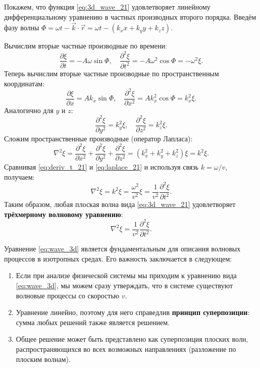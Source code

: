 \begin{theorem}
Покажем, что функция \eqref{eq:3d_wave_21} удовлетворяет линейному дифференциальному уравнению в частных производных второго порядка. Введём фазу волны $\Phi = \omega t - \vec{k} \cdot \vec{r} = \omega t - (k_x x + k_y y + k_z z)$.

Вычислим вторые частные производные по времени:
\begin{equation}
    \frac{\partial \xi}{\partial t} = -A\omega \sin\Phi, \quad
    \frac{\partial^2 \xi}{\partial t^2} = -A\omega^2 \cos\Phi = -\omega^2 \xi. \label{eq:deriv_t_21}
\end{equation}
Теперь вычислим вторые частные производные по пространственным координатам:
\begin{equation}
    \frac{\partial \xi}{\partial x} = A k_x \sin\Phi, \quad
    \frac{\partial^2 \xi}{\partial x^2} = A k_x^2 \cos\Phi = k_x^2 \xi.
\end{equation}
Аналогично для $y$ и $z$:
\begin{equation}
    \frac{\partial^2 \xi}{\partial y^2} = k_y^2 \xi, \quad
    \frac{\partial^2 \xi}{\partial z^2} = k_z^2 \xi.
\end{equation}
Сложим пространственные производные (оператор Лапласа):
\begin{equation}
    \nabla^2 \xi = \frac{\partial^2 \xi}{\partial x^2} + \frac{\partial^2 \xi}{\partial y^2} + \frac{\partial^2 \xi}{\partial z^2} = (k_x^2 + k_y^2 + k_z^2) \xi = k^2 \xi. \label{eq:laplace_21}
\end{equation}
Сравнивая \eqref{eq:deriv_t_21} и \eqref{eq:laplace_21} и используя связь $k = \omega/v$, получаем:
\begin{equation}
    \nabla^2 \xi = k^2 \xi = \frac{\omega^2}{v^2} \xi = \frac{1}{v^2} \frac{\partial^2 \xi}{\partial t^2}.
\end{equation}
Таким образом, любая плоская волна вида \eqref{eq:3d_wave_21} удовлетворяет \textbf{трёхмерному волновому уравнению}:
\begin{equation}
    \nabla^2 \xi = \frac{1}{v^2} \frac{\partial^2 \xi}{\partial t^2}. \label{eq:wave_3d}
\end{equation}
\end{theorem}

\begin{remark}
Уравнение \eqref{eq:wave_3d} является фундаментальным для описания волновых процессов в изотропных средах. Его важность заключается в следующем:
\begin{enumerate}
    \item Если при анализе физической системы мы приходим к уравнению вида \eqref{eq:wave_3d}, мы можем сразу утверждать, что в системе существуют волновые процессы со скоростью $v$.
    \item Уравнение линейно, поэтому для него справедлив \textbf{принцип суперпозиции}: сумма любых решений также является решением.
    \item Общее решение может быть представлено как суперпозиция плоских волн, распространяющихся во всех возможных направлениях (разложение по плоским волнам).
\end{enumerate}
\end{remark}
